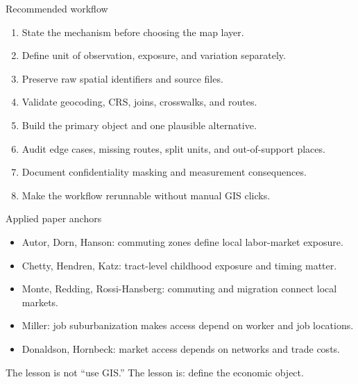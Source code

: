 \documentclass[aspectratio=169,11pt]{beamer}
\newcommand{\1}{\mathbf{1}}
\begin{document}
\begin{frame}{Recommended workflow}
\begin{enumerate}
    \item State the mechanism before choosing the map layer.
    \item Define unit of observation, exposure, and variation separately.
    \item Preserve raw spatial identifiers and source files.
    \item Validate geocoding, CRS, joins, crosswalks, and routes.
    \item Build the primary object and one plausible alternative.
    \item Audit edge cases, missing routes, split units, and out-of-support places.
    \item Document confidentiality masking and measurement consequences.
    \item Make the workflow rerunnable without manual GIS clicks.
\end{enumerate}
\end{frame}

\begin{frame}{Applied paper anchors}
\begin{itemize}
    \item Autor, Dorn, Hanson: commuting zones define local labor-market exposure.
    \item Chetty, Hendren, Katz: tract-level childhood exposure and timing matter.
    \item Monte, Redding, Rossi-Hansberg: commuting and migration connect local markets.
    \item Miller: job suburbanization makes access depend on worker and job locations.
    \item Donaldson, Hornbeck: market access depends on networks and trade costs.
\end{itemize}

\medskip
The lesson is not ``use GIS.'' The lesson is: define the economic object.
\end{frame}
\end{document}
